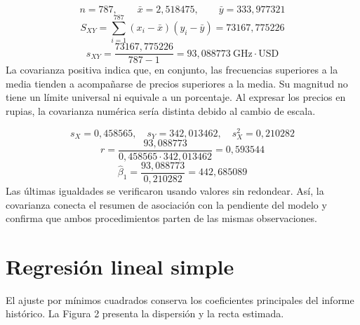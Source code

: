 \documentclass[12pt,letterpaper]{article}
\begin{document}
\begin{equation*}n=787,\qquad \bar{x}=2{,}518475,\qquad \bar{y}=333{,}977321\end{equation*}
\begin{equation*}S_{XY}=\sum_{i=1}^{787}(x_i-\bar{x})(y_i-\bar{y})=73167{,}775226\end{equation*}
\begin{equation*}s_{XY}=\frac{73167{,}775226}{787-1}=93{,}088773\ \mathrm{GHz}\cdot\mathrm{USD}\end{equation*}
La covarianza positiva indica que, en conjunto, las frecuencias superiores a la media tienden a acompañarse de precios superiores a la media. Su magnitud no tiene un límite universal ni equivale a un porcentaje. Al expresar los precios en rupias, la covarianza numérica sería distinta debido al cambio de escala.

\begin{equation*}s_X=0{,}458565,\quad s_Y=342{,}013462,\quad s_X^2=0{,}210282\end{equation*}
\begin{equation*}r=\frac{93{,}088773}{0{,}458565\cdot342{,}013462}=0{,}593544\end{equation*}
\begin{equation*}\widehat{\beta}_1=\frac{93{,}088773}{0{,}210282}=442{,}685089\end{equation*}
Las últimas igualdades se verificaron usando valores sin redondear. Así, la covarianza conecta el resumen de asociación con la pendiente del modelo y confirma que ambos procedimientos parten de las mismas observaciones.

\clearpage
\section*{Regresión lineal simple}
El ajuste por mínimos cuadrados conserva los coeficientes principales del informe histórico. La Figura 2 presenta la dispersión y la recta estimada.
\end{document}
